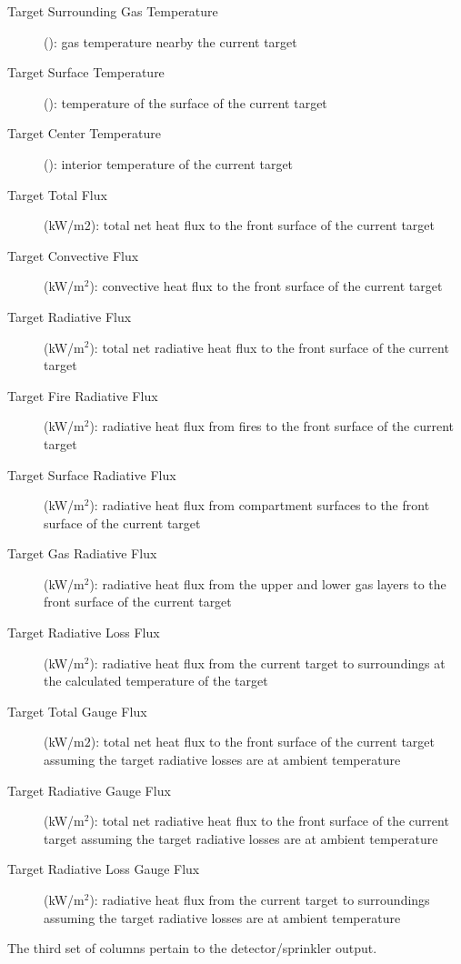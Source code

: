 \begin{description}
\item[Target Surrounding Gas Temperature] (\degc): gas temperature nearby the current target
\item[Target Surface Temperature] (\degc): temperature of the surface of the current target
\item[Target Center Temperature] (\degc): interior temperature of the current target
\item[Target Total Flux] (kW/m$2$): total net heat flux to the front surface of the current target
\item[Target Convective Flux] (kW/m$^2$): convective heat flux to the  front surface of the current target
\item[Target Radiative Flux] (kW/m$^2$): total net radiative heat flux to the front surface of the current target
\item[Target Fire Radiative Flux] (kW/m$^2$): radiative heat flux from fires to the front surface of the current target
\item[Target Surface Radiative Flux] (kW/m$^2$): radiative heat flux from compartment surfaces to the front surface of the current target
\item[Target Gas Radiative Flux] (kW/m$^2$):   radiative heat flux from the upper and lower gas layers to the front surface of the current target
\item[Target Radiative Loss Flux] (kW/m$^2$):   radiative heat flux from the current target to surroundings at the calculated temperature of the target
\item[Target Total Gauge Flux] (kW/m$2$): total net heat flux to the front surface of the current target assuming the target radiative losses are at ambient temperature
\item[Target Radiative Gauge Flux] (kW/m$^2$): total net radiative heat flux to the front surface of the current target assuming the target radiative losses are at ambient temperature
\item[Target Radiative Loss Gauge Flux] (kW/m$^2$):   radiative heat flux from the current target to surroundings assuming the target radiative losses are at ambient temperature
\end{description}
The third set of columns pertain to the detector/sprinkler output.
